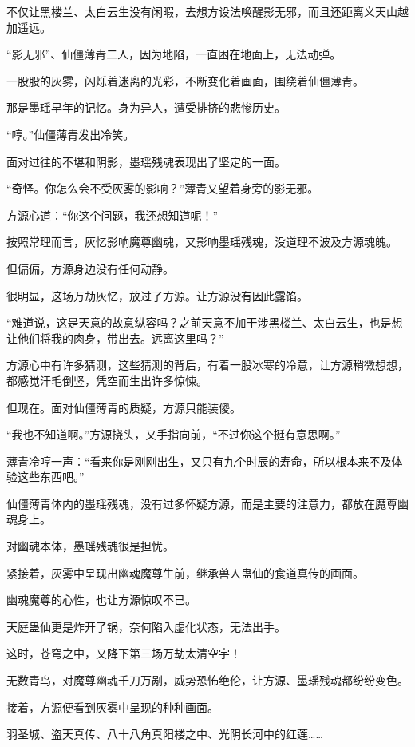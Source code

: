 \begin{this_body}
不仅让黑楼兰、太白云生没有闲暇，去想方设法唤醒影无邪，而且还距离义天山越加遥远。

“影无邪”、仙僵薄青二人，因为地陷，一直困在地面上，无法动弹。

一股股的灰雾，闪烁着迷离的光彩，不断变化着画面，围绕着仙僵薄青。

那是墨瑶早年的记忆。身为异人，遭受排挤的悲惨历史。

“哼。”仙僵薄青发出冷笑。

面对过往的不堪和阴影，墨瑶残魂表现出了坚定的一面。

“奇怪。你怎么会不受灰雾的影响？”薄青又望着身旁的影无邪。

方源心道：“你这个问题，我还想知道呢！”

按照常理而言，灰忆影响魔尊幽魂，又影响墨瑶残魂，没道理不波及方源魂魄。

但偏偏，方源身边没有任何动静。

很明显，这场万劫灰忆，放过了方源。让方源没有因此露馅。

“难道说，这是天意的故意纵容吗？之前天意不加干涉黑楼兰、太白云生，也是想让他们将我的肉身，带出去。远离这里吗？”

方源心中有许多猜测，这些猜测的背后，有着一股冰寒的冷意，让方源稍微想想，都感觉汗毛倒竖，凭空而生出许多惊悚。

但现在。面对仙僵薄青的质疑，方源只能装傻。

“我也不知道啊。”方源挠头，又手指向前，“不过你这个挺有意思啊。”

薄青冷哼一声：“看来你是刚刚出生，又只有九个时辰的寿命，所以根本来不及体验这些东西吧。”

仙僵薄青体内的墨瑶残魂，没有过多怀疑方源，而是主要的注意力，都放在魔尊幽魂身上。

对幽魂本体，墨瑶残魂很是担忧。

紧接着，灰雾中呈现出幽魂魔尊生前，继承兽人蛊仙的食道真传的画面。

幽魂魔尊的心性，也让方源惊叹不已。

天庭蛊仙更是炸开了锅，奈何陷入虚化状态，无法出手。

这时，苍穹之中，又降下第三场万劫太清空宇！

无数青鸟，对魔尊幽魂千刀万剐，威势恐怖绝伦，让方源、墨瑶残魂都纷纷变色。

接着，方源便看到灰雾中呈现的种种画面。

羽圣城、盗天真传、八十八角真阳楼之中、光阴长河中的红莲……


\end{this_body}
